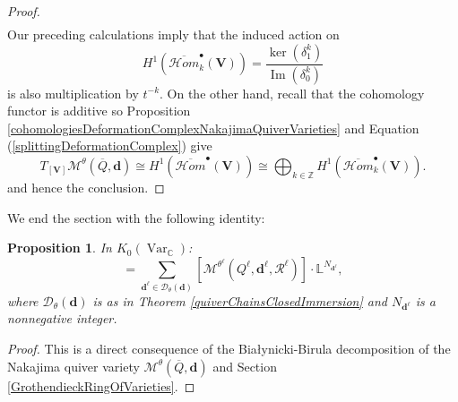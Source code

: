 \documentclass{amsart}
\theoremstyle{plain}
\newtheorem{proposition}[theorem]{Proposition}
\numberwithin{equation}{section}
\theoremstyle{definition}
\theoremstyle{remark}
\begin{document}
\begin{proof}
\begin{align*}
		\end{align*}
		Our preceding calculations imply that the induced action on
		$$
		H^1(
		\overline{\mathcal{H}om}^{\bullet}_k(\mathbf V))
		=
		\frac{\ker(\delta_1^k)}
		{\operatorname{Im}(\delta_0^k)}
		$$
		is also multiplication by $t^{-k}$.
		On the other hand, recall that the cohomology functor is additive
		\cite[Exercise 1.2.1]{WeibelHomologicalAlgebra} so Proposition \ref{cohomologiesDeformationComplexNakajimaQuiverVarieties} and Equation
		(\ref{splittingDeformationComplex}) give
		$$
		T_{[\mathbf{V}]}\mathcal{M}^{\theta}(\overline{Q},\mathbf{d})\cong H^1(\overline{\mathcal{H}om}^{\bullet}(\mathbf V))
		\cong
		\bigoplus_{k\in\mathbb Z}
		H^1(
		\overline{\mathcal{H}om}^{\bullet}_k(\mathbf V)).
		$$
		and hence the conclusion. 
	\end{proof}
	We end the section with the following identity: 
	\begin{proposition}\label{motivicBialynickiBirulaDecomposition}
	In $K_0(\operatorname{Var}_\mathbb{C})$:
	\begin{equation}
	[\mathcal{M}^{\theta}(\overline{Q},\mathbf{d})]=\sum_{\mathbf{d}^\ell\in \mathscr{D}_\theta(\mathbf{d})}[\mathcal{M}^{\theta^\ell}(Q^\ell,\mathbf{d}^\ell,\mathcal{R}^\ell)]\cdot \mathbb{L}^{N_{\mathbf{d}^\ell}},
	\end{equation}
	where $	\mathscr{D}_\theta(\mathbf{d})$ is as in Theorem \ref{quiverChainsClosedImmersion} and $N_{\mathbf{d}^\ell}$ is a nonnegative integer.
	\end{proposition}
	\begin{proof}
	This is a direct consequence of the Bia\l ynicki-Birula decomposition of the Nakajima quiver variety $\mathcal{M}^{\theta}(\overline{Q},\mathbf{d})$ and Section \ref{GrothendieckRingOfVarieties}. 

	\end{proof}
\end{document}
